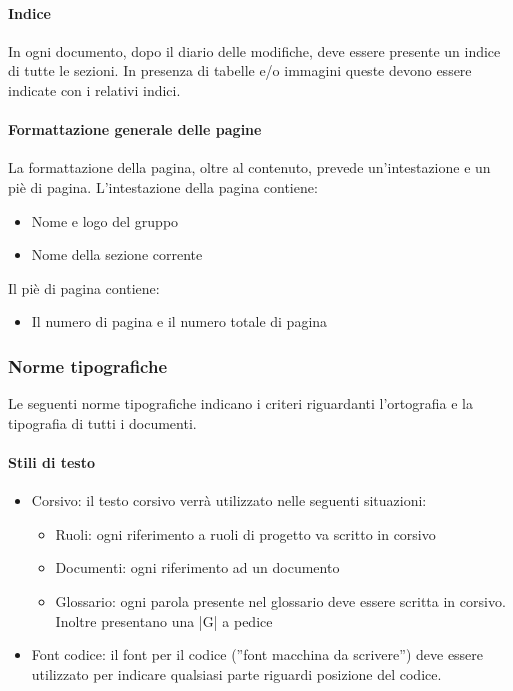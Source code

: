 \paragraph{Indice}

In ogni documento, dopo il diario delle modifiche, deve essere presente un indice di tutte le
sezioni. In presenza di tabelle e/o immagini queste devono essere indicate con i relativi indici.

\paragraph{Formattazione generale delle pagine}

La formattazione della pagina, oltre al contenuto, prevede un’intestazione e un piè di pagina.
L’intestazione della pagina contiene:
\begin{itemize}
\item Nome e logo del gruppo
\item Nome della sezione corrente
\end{itemize}

Il piè di pagina contiene:
\begin{itemize} 
\item Il numero di pagina e il numero totale di pagina
\end{itemize}

\subsubsection{Norme tipografiche}

Le seguenti norme tipografiche indicano i criteri riguardanti l’ortografia e la tipografia di tutti i documenti.

\paragraph{Stili di testo}

\begin{itemize}
\item Corsivo: il testo corsivo verrà utilizzato nelle seguenti situazioni:

  \begin{itemize}
  \item  Ruoli: ogni riferimento a ruoli di progetto va scritto in corsivo
  \item  Documenti: ogni riferimento ad un documento
  \item  Glossario: ogni parola presente nel glossario deve essere scritta in corsivo. Inoltre presentano una |G| a pedice
  \end{itemize}

\item Font codice: il font per il codice (''font macchina da scrivere'') deve essere utilizzato per indicare qualsiasi parte riguardi posizione del codice.
\end{itemize}

